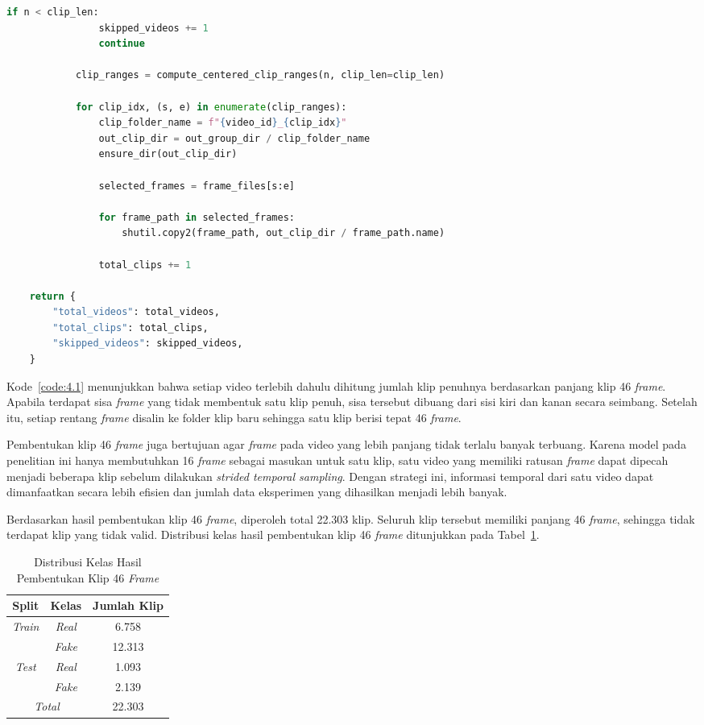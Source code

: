\begin{lstlisting}[language=Python, caption={Pembentukan Klip 46 \textit{Frame}}, label={code:4.1}]
			if n < clip_len:
				skipped_videos += 1
				continue

			clip_ranges = compute_centered_clip_ranges(n, clip_len=clip_len)

			for clip_idx, (s, e) in enumerate(clip_ranges):
				clip_folder_name = f"{video_id}_{clip_idx}"
				out_clip_dir = out_group_dir / clip_folder_name
				ensure_dir(out_clip_dir)

				selected_frames = frame_files[s:e]

				for frame_path in selected_frames:
					shutil.copy2(frame_path, out_clip_dir / frame_path.name)

				total_clips += 1

	return {
		"total_videos": total_videos,
		"total_clips": total_clips,
		"skipped_videos": skipped_videos,
	}
\end{lstlisting}

Kode~\ref{code:4.1} menunjukkan bahwa setiap video terlebih dahulu dihitung jumlah klip penuhnya berdasarkan panjang klip 46 \textit{frame}. Apabila terdapat sisa \textit{frame} yang tidak membentuk satu klip penuh, sisa tersebut dibuang dari sisi kiri dan kanan secara seimbang. Setelah itu, setiap rentang \textit{frame} disalin ke folder klip baru sehingga satu klip berisi tepat 46 \textit{frame}.

Pembentukan klip 46 \textit{frame} juga bertujuan agar \textit{frame} pada video yang lebih panjang tidak terlalu banyak terbuang. Karena model pada penelitian ini hanya membutuhkan 16 \textit{frame} sebagai masukan untuk satu klip, satu video yang memiliki ratusan \textit{frame} dapat dipecah menjadi beberapa klip sebelum dilakukan \textit{strided temporal sampling}. Dengan strategi ini, informasi temporal dari satu video dapat dimanfaatkan secara lebih efisien dan jumlah data eksperimen yang dihasilkan menjadi lebih banyak.

Berdasarkan hasil pembentukan klip 46 \textit{frame}, diperoleh total 22.303 klip. Seluruh klip tersebut memiliki panjang 46 \textit{frame}, sehingga tidak terdapat klip yang tidak valid. Distribusi kelas hasil pembentukan klip 46 \textit{frame} ditunjukkan pada Tabel~\ref{table:4.klip46}.

\begin{table}[htbp]
	\centering
	\caption{Distribusi Kelas Hasil Pembentukan Klip 46 \textit{Frame}}
	\label{table:4.klip46}
	\begin{tabular}{ccc}
		\toprule
		\textbf{Split} & \textbf{Kelas} & \textbf{Jumlah Klip} \\
		\midrule
		\multirow{2}{*}{\textit{Train}} & \textit{Real} & 6.758 \\
		& \textit{Fake} & 12.313 \\
		\cmidrule(lr){1-3}
		\multirow{2}{*}{\textit{Test}} & \textit{Real} & 1.093 \\
		& \textit{Fake} & 2.139 \\
		\midrule
		\multicolumn{2}{c}{\textit{Total}} & 22.303 \\
		\bottomrule
	\end{tabular}
\end{table}

